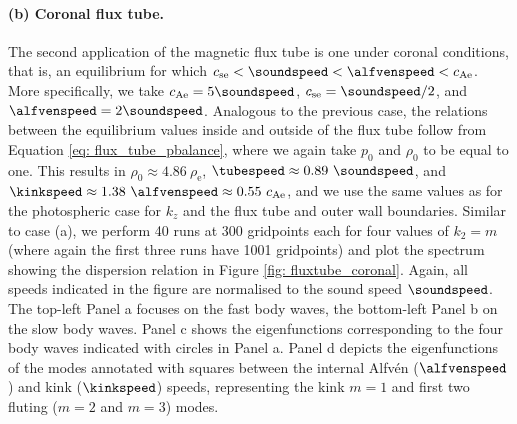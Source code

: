 \paragraph{(b) Coronal flux tube.} The second application of the magnetic flux tube is one under coronal conditions, that is, an equilibrium for which $c_\text{se} < \soundspeed < \alfvenspeed < c_\text{Ae}$. More specifically, we take
$c_\text{Ae} = 5\soundspeed$, $c_\text{se} = \soundspeed/2$, and $\alfvenspeed = 2\soundspeed$. Analogous to the previous case, the relations between the equilibrium values inside and outside of the flux tube follow from Equation \eqref{eq: flux_tube_pbalance}, where we again take $p_0$ and $\rho_0$ to be equal to one. This results in
$\rho_0 \approx 4.86~\rho_\text{e}$, $\tubespeed \approx 0.89~\soundspeed$, and
$\kinkspeed \approx 1.38~\alfvenspeed \approx 0.55~c_\text{Ae}$, and we use the same values as for the photospheric case for $k_z$ and the flux tube and outer wall boundaries. Similar to case (a), we perform 40 runs at 300 gridpoints each for four values of $k_2 = m$ (where again the first three runs have 1001 gridpoints) and plot the spectrum showing the dispersion relation in Figure \ref{fig: fluxtube_coronal}. Again, all speeds indicated in the figure are normalised to the sound speed $\soundspeed$. The top-left Panel a focuses on the fast body waves, the bottom-left Panel b on the slow body waves. Panel c shows the eigenfunctions corresponding to the four body waves indicated with circles in Panel a. Panel d depicts the eigenfunctions of the modes annotated with squares between the internal Alfv\'en ($\alfvenspeed$) and kink ($\kinkspeed$) speeds, representing the kink $m = 1$ and first two fluting ($m = 2$ and $m = 3$) modes.

